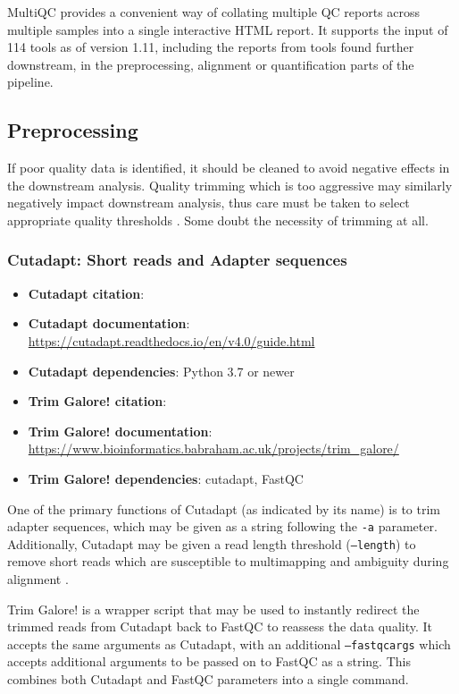 MultiQC provides a convenient way of collating multiple QC reports across multiple samples into a single interactive HTML report. It supports the input of 114 tools as of version 1.11, including the reports from tools found further downstream, in the preprocessing, alignment or quantification parts of the pipeline. 

\subsection{Preprocessing}
If poor quality data is identified, it should be cleaned to avoid negative effects in the downstream analysis. Quality trimming which is too aggressive may similarly negatively impact downstream analysis, thus care must be taken to select appropriate quality thresholds \citep{davis2019}. Some \citep{liao2020read} doubt the necessity of trimming at all.

\subsubsection{Cutadapt: Short reads and Adapter sequences}
\label{cutadapt}
\begin{itemize}\itemsep-0.5em
\item[]\textbf{Cutadapt citation}: 				\cite{martin2011cutadapt}
\item[]\textbf{Cutadapt documentation}: 	\url{https://cutadapt.readthedocs.io/en/v4.0/guide.html}
\item[]\textbf{Cutadapt dependencies}: Python 3.7 or newer
\item[]\textbf{Trim Galore! citation}: 				\cite{trimgalore}
\item[]\textbf{Trim Galore! documentation}: 	\url{https://www.bioinformatics.babraham.ac.uk/projects/trim_galore/}
\item[]\textbf{Trim Galore! dependencies}: cutadapt, FastQC
\end{itemize}


One of the primary functions of Cutadapt (as indicated by its name) is to trim adapter sequences, which may be given as a string following the \texttt{-a} parameter. Additionally, Cutadapt may be given a read length threshold (\texttt{--length}) to remove short reads which are susceptible to multimapping and ambiguity during alignment \citep{deschamps2020handling}. 

Trim Galore! is a wrapper script that may be used to instantly redirect the trimmed reads from Cutadapt back to FastQC to reassess the data quality. It accepts the same arguments as Cutadapt, with an additional \texttt{--fastqc\textunderscore args} which accepts additional arguments to be passed on to FastQC as a string. This combines both Cutadapt and FastQC parameters into a single command. 

